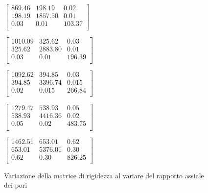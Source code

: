 \documentclass[a4paper,num-refs]{oup-contemporary}
\begin{document}
\begin{figure}
	\begin{minipage}[b]{0.19\linewidth}
		\scriptsize	{$
			\begin{bmatrix}
				869.46 & 198.19 & 0.02 \\
				198.19 & 1857.50 & 0.01 \\
				0.03 & 0.01& 103.37 \\
			\end{bmatrix}
			$}
	\end{minipage}
	\begin{minipage}[b]{0.19\linewidth}
		\scriptsize	{$
			\begin{bmatrix}
				1010.09 & 325.62 & 0.03 \\
				325.62 & 2883.80 & 0.01\\
				0.03 & 0.01 & 196.39 \\
			\end{bmatrix}
			$}
	\end{minipage}
	\begin{minipage}[b]{0.19\linewidth}
		\scriptsize	{$
			\begin{bmatrix}
				1092.62 & 394.85 & 0.03\\
				394.85 & 3396.74 & 0.015 \\
				0.02 & 0.015 & 266.84 \\
			\end{bmatrix}
			$}
	\end{minipage}
	\begin{minipage}[b]{0.19\linewidth}
		\scriptsize	{$
			\begin{bmatrix}
				1279.47 & 538.93 & 0.05 \\
				538.93 & 4416.36 & 0.02 \\
				0.05 & 0.02 & 483.75 \\
			\end{bmatrix}
			$}
	\end{minipage}
	\begin{minipage}[b]{0.19\linewidth}
		\scriptsize	{$
			\begin{bmatrix}
				1462.51 & 653.01 & 0.62 \\
				653.01 & 5376.01 & 0.30 \\
				0.62 & 0.30 & 826.25 \\
			\end{bmatrix}
			$}
	\end{minipage} 
	
	\caption{Variazione della matrice di rigidezza al variare del rapporto assiale dei pori}
	\label{fig:geometry_variation} 
\end{figure}
\end{document}
